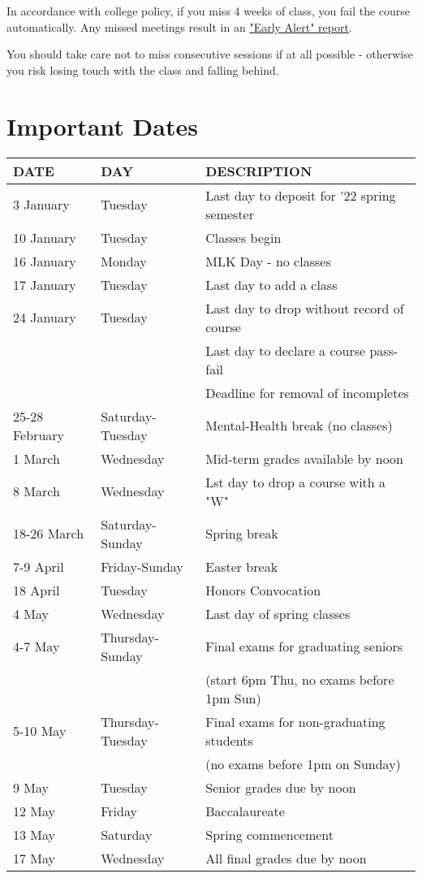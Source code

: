 \documentclass[11pt]{article}
\begin{document}
In accordance with college policy, if you miss 4 weeks of class, you
fail the course automatically. Any missed meetings result in an \href{https://catalog.lyon.edu/class-attendance}{"Early
Alert" report}.

You should take care not to miss consecutive sessions if at all
possible - otherwise you risk losing touch with the class and falling
behind.
\section{Important Dates}
\label{sec:orgbd582d3}

\begin{center}
\begin{tabular}{lll}
DATE & DAY & DESCRIPTION\\
\hline
3 January & Tuesday & Last day to deposit for '22 spring semester\\
10 January & Tuesday & Classes begin\\
16 January & Monday & MLK Day - no classes\\
17 January & Tuesday & Last day to add a class\\
24 January & Tuesday & Last day to drop without record of course\\
 &  & Last day to declare a course pass-fail\\
 &  & Deadline for removal of incompletes\\
25-28 February & Saturday-Tuesday & Mental-Health break (no classes)\\
1 March & Wednesday & Mid-term grades available by noon\\
8 March & Wednesday & Lst day to drop a course with a "W"\\
18-26 March & Saturday-Sunday & Spring break\\
7-9 April & Friday-Sunday & Easter break\\
18 April & Tuesday & Honors Convocation\\
4 May & Wednesday & Last day of spring classes\\
4-7 May & Thursday-Sunday & Final exams for graduating seniors\\
 &  & (start 6pm Thu, no exams before 1pm Sun)\\
5-10 May & Thursday-Tuesday & Final exams for non-graduating students\\
 &  & (no exams before 1pm on Sunday)\\
9 May & Tuesday & Senior grades due by noon\\
12 May & Friday & Baccalaureate\\
13 May & Saturday & Spring commencement\\
17 May & Wednesday & All final grades due by noon\\
\end{tabular}
\end{center}
\end{document}
